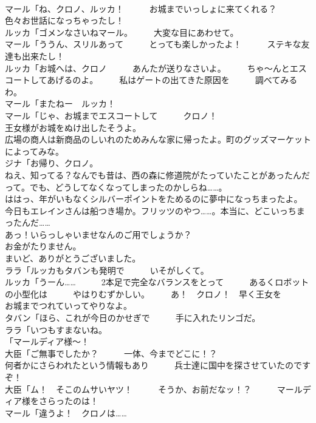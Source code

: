 \documentclass[8pt]{extreport}
\begin{document}
\begin{CJK}{UTF8}{min}
\\	マール「ね、クロノ、ルッカ！　　　お城までいっしょに来てくれる？　　　色々お世話になっちゃったし！	
\\	ルッカ「ゴメンなさいねマール。　　　大変な目にあわせて。	
\\	マール「ううん、スリルあって　　　とっても楽しかったよ！　　　ステキな友達も出来たし！	
\\	ルッカ「お城へは、クロノ　　　あんたが送りなさいよ。　　　ちゃ～んとエスコートしてあげるのよ。　　　私はゲートの出てきた原因を　　　調べてみるわ。	
\\	マール「またねー　ルッカ！	
\\	マール「じゃ、お城までエスコートして　　　クロノ！	
\\	王女様がお城をぬけ出したそうよ。	
\\	広場の商人は新商品のしいれのためみんな家に帰ったよ。町のグッズマーケットによってみな。	
\\	ジナ「お帰り、クロノ。	
\\	ねえ、知ってる？なんでも昔は、西の森に修道院がたっていたことがあったんだって。でも、どうしてなくなってしまったのかしらね……。	
\\	ははっ、年がいもなくシルバーポイントをためるのに夢中になっちまったよ。	
\\	今日もエレインさんは船つき場か。フリッツのやつ……。本当に、どこいっちまったんだ……	
\\	あっ！いらっしゃいませなんのご用でしょうか？	
\\	お金がたりません。	
\\	まいど、ありがとうございました。	
\\	ララ「ルッカもタバンも発明で　　　いそがしくて。	
\\	ルッカ「うーん……　　　2本足で完全なバランスをとって　　　あるくロボットの小型化は　　　やはりむずかしい。　　　あ！　クロノ！　早く王女を　　　お城までつれていってやりなよ。	
\\	タバン「ほら、これが今日のかせぎで　　　手に入れたリンゴだ。	
\\	ララ「いつもすまないね。	
\\	「マールディア様～！	
\\	大臣「ご無事でしたか？　　　一体、今までどこに！？	
\\	何者かにさらわれたという情報もあり　　　兵士達に国中を探させていたのですぞ！	
\\	大臣「ム！　そこのムサいヤツ！　　　そうか、お前だなッ！？　　　マールディア様をさらったのは！	
\\	マール「違うよ！　クロノは……	

\end{CJK}
\end{document}
